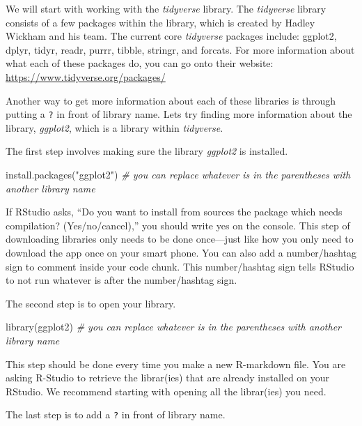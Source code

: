 \documentclass[
]{book}
\newenvironment{Shaded}{\begin{snugshade}}{\end{snugshade}}
\newcommand{\CommentTok}[1]{\textcolor[rgb]{0.56,0.35,0.01}{\textit{#1}}}
\newcommand{\FunctionTok}[1]{\textcolor[rgb]{0.00,0.00,0.00}{#1}}
\newcommand{\NormalTok}[1]{#1}
\newcommand{\StringTok}[1]{\textcolor[rgb]{0.31,0.60,0.02}{#1}}
\begin{document}
We will start with working with the \emph{tidyverse} library. The \emph{tidyverse} library consists of a few packages within the library, which is created by Hadley Wickham and his team. The current core \emph{tidyverse} packages include: ggplot2, dplyr, tidyr, readr, purrr, tibble, stringr, and forcats. For more information about what each of these packages do, you can go onto their website: \url{https://www.tidyverse.org/packages/}

Another way to get more information about each of these libraries is through putting a \texttt{?} in front of library name. Lets try finding more information about the library, \emph{ggplot2}, which is a library within \emph{tidyverse}.

The first step involves making sure the library \emph{ggplot2} is installed.

\begin{Shaded}
\begin{Highlighting}[]
\FunctionTok{install.packages}\NormalTok{(}\StringTok{"ggplot2"}\NormalTok{) }\CommentTok{\# you can replace whatever is in the parentheses with another library name }
\end{Highlighting}
\end{Shaded}

If RStudio asks, ``Do you want to install from sources the package which needs compilation? (Yes/no/cancel),'' you should write yes on the console. This step of downloading libraries only needs to be done once---just like how you only need to download the app once on your smart phone. You can also add a number/hashtag sign to comment inside your code chunk. This number/hashtag sign tells RStudio to not run whatever is after the number/hashtag sign.

The second step is to open your library.

\begin{Shaded}
\begin{Highlighting}[]
\FunctionTok{library}\NormalTok{(ggplot2) }\CommentTok{\# you can replace whatever is in the parentheses with another library name }
\end{Highlighting}
\end{Shaded}

This step should be done every time you make a new R-markdown file. You are asking R-Studio to retrieve the librar(ies) that are already installed on your RStudio. We recommend starting with opening all the librar(ies) you need.

The last step is to add a \texttt{?} in front of library name.
\end{document}
